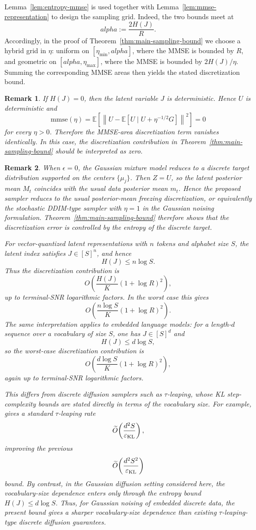 \documentclass[11pt]{article}
\def\alpha{alpha}%
\newtheorem{remark}{Remark}
\newcommand{\E}{\mathbb{E}}
\newcommand{\mmse}{\mathrm{mmse}}
\newcommand{\eps}{\epsilon}
\newcommand{\norm}[1]{\left\lVert #1 \right\rVert}
\begin{document}
Lemma~\ref{lem:entropy-mmse} is used together with
Lemma~\ref{lem:mmse-representation} to design the sampling grid. Indeed, the
two bounds meet at
\[
    \alpha:=\frac{2H(J)}{R}.
\]
Accordingly, in the proof of Theorem~\ref{thm:main-sampling-bound} we choose a
hybrid grid in \(\eta\): uniform on \([\eta_{\min},\alpha]\), where the MMSE is
bounded by \(R\), and geometric on \([\alpha,\eta_{\max}]\), where the MMSE is
bounded by \(2H(J)/\eta\). Summing the corresponding MMSE areas then yields the
stated discretization bound.
\begin{remark}
If \(H(J)=0\), then the latent variable \(J\) is deterministic. Hence \(U\)
is deterministic and
\[
    \mmse(\eta)
    =
    \E\left[
    \norm{U-\E[U\mid U+\eta^{-1/2}G]}^2
    \right]
    =
    0
\]
for every \(\eta>0\). Therefore the MMSE-area discretization term vanishes
identically. In this case, the discretization contribution in
Theorem~\ref{thm:main-sampling-bound} should be interpreted as zero.
\end{remark}
\begin{remark}
\label{rem:discrete-vq-language}
When $\eps=0$, the Gaussian mixture model reduces to a discrete target
distribution supported on the centers $\{\mu_j\}$. Then $Z=U$, so the latent
posterior mean $M_t$ coincides with the usual data posterior mean $m_t$.
Hence the proposed sampler reduces to the usual posterior-mean freezing
discretization, or equivalently the stochastic DDIM-type sampler with
$\eta=1$ in the Gaussian noising formulation. Theorem~\ref{thm:main-sampling-bound}
therefore shows that the discretization error is controlled by the entropy of
the discrete target.

For vector-quantized latent representations with $n$ tokens and alphabet size
$S$, the latent index satisfies $J\in[S]^n$, and hence
\[
    H(J)\le n\log S .
\]
Thus the discretization contribution is
\[
    O\!\left(
        \frac{H(J)}{K}(1+\log R)^2
    \right),
\]
up to terminal-SNR logarithmic factors. In the worst case this gives
\[
    O\!\left(
        \frac{n\log S}{K}(1+\log R)^2
    \right).
\]
The same interpretation applies to embedded language models: for a length-$d$
sequence over a vocabulary of size $S$, one has $J\in[S]^d$ and
\[
    H(J)\le d\log S ,
\]
so the worst-case discretization contribution is
\[
    O\!\left(
        \frac{d\log S}{K}(1+\log R)^2
    \right),
\]
again up to terminal-SNR logarithmic factors.

This differs from discrete diffusion samplers such as $\tau$-leaping, whose KL
step-complexity bounds are stated directly in terms of the vocabulary size.
For example, \cite{liang2025discrete} gives a standard $\tau$-leaping rate
\[
    \widetilde O\!\left(\frac{d^2 S}{\varepsilon_{\rm KL}}\right),
\]
improving the previous
\[
    \widetilde O\!\left(\frac{d^2 S^2}{\varepsilon_{\rm KL}}\right)
\]
bound. By contrast, in the Gaussian diffusion setting considered here, the
vocabulary-size dependence enters only through the entropy bound
$H(J)\le d\log S$. Thus, for Gaussian noising of embedded discrete data, the present bound gives
a sharper vocabulary-size dependence than existing \(\tau\)-leaping-type
discrete diffusion guarantees.
\end{remark}
\end{document}
